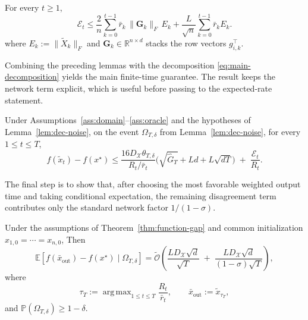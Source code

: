\documentclass[runningheads]{llncs}
\DeclareMathOperator*{\argmax}{arg\,max}
\newcommand{\Prob}{\mathbb{P}}
\begin{document}
\begin{lemma}\label{lem:consensus-exp}
For every \(t\ge 1\),
\[
\mathcal E_t
\le
\frac{2}{n}\sum_{k=0}^{t-1}\bar r_k\,\|\mathbf G_k\|_F\,E_k
+
\frac{L}{\sqrt n}\sum_{k=0}^{t-1}\bar r_k E_k.
\]
where \(E_k:=\|\widetilde X_k\|_F\) and \(\mathbf G_k\in\mathbb R^{n\times d}\)
stacks the row vectors \(g_{i,k}^\top\).
\end{lemma}

Combining the preceding lemmas with the decomposition
\eqref{eq:main-decomposition} yields the main finite-time guarantee. The
result keeps the network term explicit, which is useful before passing to the
expected-rate statement.

\begin{theorem}\label{thm:function-gap}
Under Assumptions~\ref{ass:domain}--\ref{ass:oracle} and the hypotheses of
Lemma~\ref{lem:dec-noise}, on the event \(\Omega_{T,\delta}\) from
Lemma~\ref{lem:dec-noise}, for every \(1\le t\le T\),
\begin{equation}\label{eq:function-gap-divided}
f(\tilde x_t)-f(x^\star)
\le
\frac{16D_{\mathcal{X}}\theta_{T,\delta}}{R_t/\bar r_t}
\bigl(\sqrt{\hat G_T}+Ld+L\sqrt{dT}\bigr)
\;+\;
\frac{\mathcal E_t}{R_t}.
\end{equation}
\end{theorem}

The final step is to show that, after choosing the most favorable weighted
output time and taking conditional expectation, the remaining disagreement
term contributes only the standard network factor \(1/(1-\sigma)\).

\begin{theorem}\label{thm:expected-rate}
Under the assumptions of Theorem~\ref{thm:function-gap} and common
initialization \(x_{1,0}=\cdots=x_{n,0}\),
Then
\begin{equation}
\label{eq:expected-rate-tilde}
\mathbb E\!\left[f(\bar x_{\mathrm{out}})-f(x^\star)\mid \Omega_{T,\delta}\right]
=
\widetilde{\mathcal O}\!\left(
\frac{L D_{\mathcal{X}}\sqrt d}{\sqrt T}
\;+\;
\frac{L D_{\mathcal{X}}\sqrt d}{(1-\sigma)\sqrt T}
\right),
\end{equation}
where
\[
\tau_T:=\argmax_{1\le t\le T}\frac{R_t}{\bar r_t},
\qquad
\bar x_{\mathrm{out}}:=\tilde x_{\tau_T},
\]
and \(\Prob(\Omega_{T,\delta})\ge 1-\delta\).
\end{theorem}
\end{document}
